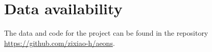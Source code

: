 \documentclass[usenatbib]{mnras} %
\begin{document}
\section*{Data availability}
The data and code for the project can be found in the repository \url{https://github.com/zixiao-h/aeons}.


% 


\label{lastpage}
\end{document}
